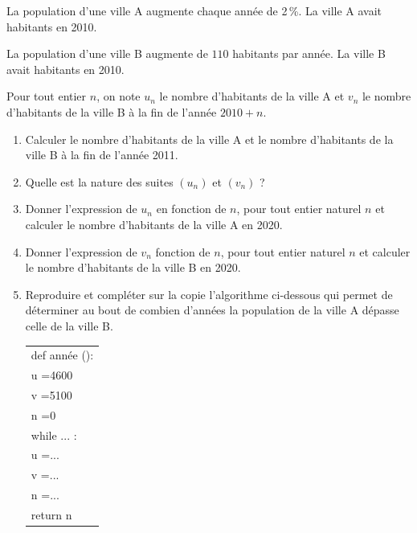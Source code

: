 \medskip

La population d'une ville A augmente chaque année de 2\,\%. La ville A avait  habitants en 2010.

La population d'une ville B augmente de $110$ habitants par année. La ville B avait  habitants en 2010.

Pour tout entier $n$, on note $u_n$ le nombre d'habitants de la ville A et $v_n$ le nombre d'habitants de la ville B à la fin de l'année $2010+n$.

\begin{enumerate}
\item  Calculer le nombre d'habitants de la ville A et le nombre d'habitants de la ville B à la fin de l'année 2011.
\item Quelle est la nature des suites $\left(u_n\right)$ et $\left(v_n\right)$ ?
\item Donner l'expression de $u_n$ en fonction de $n$, pour tout entier naturel $n$ et calculer le nombre d'habitants de la ville A en 2020.
\item Donner l'expression de $v_n$ fonction de $n$, pour tout entier naturel $n$ et calculer le nombre d'habitants de la ville B en 2020.
\item Reproduire et compléter sur la copie l'algorithme ci-dessous qui permet de déterminer au bout de combien d'années la population de la ville A dépasse celle de la ville B.

\begin{center}
\begin{tabular}[]{|l|}
\hline
def année ():\\
\hspace{0.6em} u =4600\\
\hspace{0.6em} v =5100\\
\hspace{0.6em} n =0\\
\hspace{0.6em}while ... :\\
\hspace{1em} u =...\\
\hspace{1em} v =...\\
\hspace{1em} n =...\\
return n\\
\hline
\end{tabular}
\end{center}
\end{enumerate}
\vspace{0.75cm}
